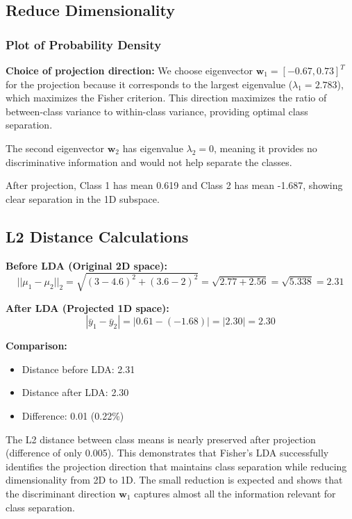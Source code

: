 \documentclass[12pt]{article}
\begin{document}
\subsection{Reduce Dimensionality}

\subsubsection{Plot of Probability Density}

\textbf{Choice of projection direction:} We choose eigenvector $\mathbf{w}_1 = [-0.67, 0.73]^T$ for the projection because it corresponds to the largest eigenvalue ($\lambda_1 = 2.783$), which maximizes the Fisher criterion. This direction maximizes the ratio of between-class variance to within-class variance, providing optimal class separation.

The second eigenvector $\mathbf{w}_2$ has eigenvalue $\lambda_2 = 0$, meaning it provides no discriminative information and would not help separate the classes.

After projection, Class 1 has mean 0.619 and Class 2 has mean -1.687, showing clear separation in the 1D subspace.

\subsection{L2 Distance Calculations}

\textbf{Before LDA (Original 2D space):}
\begin{equation}
    ||\mu_1 - \mu_2||_2 = \sqrt{(3 - 4.6)^2 + (3.6 - 2)^2} = \sqrt{2.77 + 2.56} = \sqrt{5.338} = 2.31
\end{equation}

\textbf{After LDA (Projected 1D space):}
\begin{equation}
    |\bar{y}_1 - \bar{y}_2| = |0.61 - (-1.68)| = |2.30| = 2.30
\end{equation}

\textbf{Comparison:}
\begin{itemize}
    \item Distance before LDA: 2.31
    \item Distance after LDA: 2.30
    \item Difference: 0.01 (0.22\%)
\end{itemize}

The L2 distance between class means is nearly preserved after projection (difference of only 0.005). This demonstrates that Fisher's LDA successfully identifies the projection direction that maintains class separation while reducing dimensionality from 2D to 1D. The small reduction is expected and shows that the discriminant direction $\mathbf{w}_1$ captures almost all the information relevant for class separation.
\end{document}
